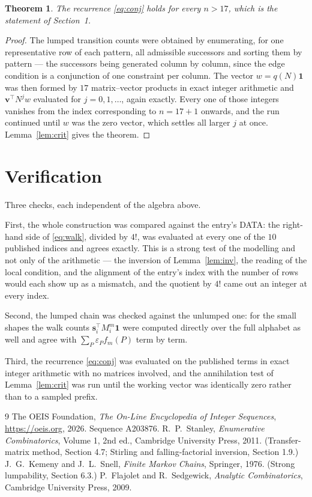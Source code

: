 \documentclass[11pt,a4paper]{article}
\theoremstyle{plain}
\newtheorem{theorem}{Theorem}
\theoremstyle{definition}
\begin{document}
\begin{theorem}
The recurrence \eqref{eq:conj} holds for every $n>17$, which is the statement of
Section~1.
\end{theorem}

\begin{proof}
The lumped transition counts were obtained by enumerating, for one representative row of
each pattern, all admissible successors and sorting them by pattern --- the successors being
generated column by column, since the edge condition is a conjunction of one constraint per
column. The vector $w=q(N)\mathbf{1}$ was then formed by $17$ matrix--vector products
in exact integer arithmetic and $\mathbf{v}^{\!\top}N^{j}w$ evaluated for
$j=0,1,\dots$, again exactly. Every one of those integers vanishes from the index
corresponding to $n=17+1$ onwards, and the run continued until $w$ was the zero vector,
which settles all larger $j$ at once. Lemma~\ref{lem:crit} gives the theorem.
\end{proof}

\section{Verification}

Three checks, each independent of the algebra above.

First, the whole construction was compared against the entry's DATA: the right-hand side of
\eqref{eq:walk}, divided by $4!$, was evaluated at every one of the $10$
published indices and agrees exactly. This is a strong test of the modelling and not only of
the arithmetic --- the inversion of Lemma~\ref{lem:inv}, the reading of the local
condition, and the alignment of the entry's index with the number of rows would each
show up as a mismatch, and the quotient by $4!$ came out an integer at every index.

Second, the lumped chain was checked against the unlumped one: for the small shapes the walk
counts $\mathbf{s}_i^{\!\top}M_i^{m}\mathbf{1}$ were computed directly over the full
alphabet as well and agree with $\sum_P\varepsilon_Pf_m(P)$ term by term.

Third, the recurrence \eqref{eq:conj} was evaluated on the published terms in exact integer
arithmetic with no matrices involved, and the annihilation test of Lemma~\ref{lem:crit} was
run until the working vector was identically zero rather than to a sampled prefix.

\begin{thebibliography}{9}
 The OEIS Foundation, \emph{The On-Line Encyclopedia of Integer
Sequences}, \url{https://oeis.org}, 2026. Sequence A203876.
 R.~P.~Stanley, \emph{Enumerative Combinatorics}, Volume 1, 2nd ed.,
Cambridge University Press, 2011. (Transfer-matrix method, Section 4.7; Stirling and
falling-factorial inversion, Section 1.9.)
 J.~G.~Kemeny and J.~L.~Snell, \emph{Finite Markov Chains}, Springer,
1976. (Strong lumpability, Section 6.3.)
 P.~Flajolet and R.~Sedgewick, \emph{Analytic Combinatorics}, Cambridge
University Press, 2009.
\end{thebibliography}
\end{document}
